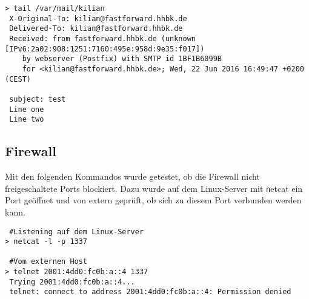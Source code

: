 \begin{lstlisting}[numbers=none]
> tail /var/mail/kilian 
 X-Original-To: kilian@fastforward.hhbk.de
 Delivered-To: kilian@fastforward.hhbk.de
 Received: from fastforward.hhbk.de (unknown [IPv6:2a02:908:1251:7160:495e:958d:9e35:f017])
	by webserver (Postfix) with SMTP id 1BF1B6099B
	for <kilian@fastforward.hhbk.de>; Wed, 22 Jun 2016 16:49:47 +0200 (CEST)

 subject: test
 Line one
 Line two
\end{lstlisting}

\subsection{Firewall}

Mit den folgenden Kommandos wurde getestet, ob die Firewall nicht freigeschaltete Ports blockiert. Dazu wurde auf dem Linux-Server mit {\texttt netcat} ein Port geöffnet und von extern geprüft, ob sich zu diesem Port verbunden werden kann.

\begin{lstlisting}
 #Listening auf dem Linux-Server
> netcat -l -p 1337

 #Vom externen Host
> telnet 2001:4dd0:fc0b:a::4 1337
 Trying 2001:4dd0:fc0b:a::4...
 telnet: connect to address 2001:4dd0:fc0b:a::4: Permission denied
\end{lstlisting}

